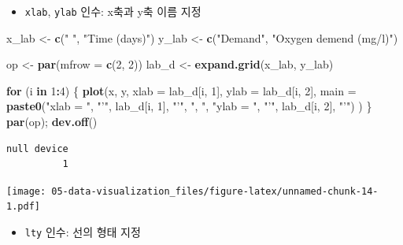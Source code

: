 \documentclass[
  11pt,
]{krantz}
\newenvironment{Shaded}{\begin{snugshade}}{\end{snugshade}}
\newcommand{\ControlFlowTok}[1]{\textcolor[rgb]{0.27,0.27,0.27}{\textbf{#1}}}
\newcommand{\DataTypeTok}[1]{\textcolor[rgb]{0.27,0.27,0.27}{#1}}
\newcommand{\DecValTok}[1]{\textcolor[rgb]{0.06,0.06,0.06}{#1}}
\newcommand{\KeywordTok}[1]{\textcolor[rgb]{0.27,0.27,0.27}{\textbf{#1}}}
\newcommand{\NormalTok}[1]{#1}
\newcommand{\OperatorTok}[1]{\textcolor[rgb]{0.43,0.43,0.43}{\textbf{#1}}}
\newcommand{\StringTok}[1]{\textcolor[rgb]{0.5,0.5,0.5}{#1}}
\providecommand{\tightlist}{%
  \setlength{\itemsep}{0pt}\setlength{\parskip}{0pt}}
\begin{document}
\normalsize

\begin{itemize}
\tightlist
\item
  \texttt{xlab}, \texttt{ylab} 인수: x축과 y축 이름 지정
\end{itemize}

\footnotesize

\begin{Shaded}
\begin{Highlighting}[]
\NormalTok{x_lab <-}\StringTok{ }\KeywordTok{c}\NormalTok{(}\StringTok{" "}\NormalTok{, }\StringTok{"Time (days)"}\NormalTok{)}
\NormalTok{y_lab <-}\StringTok{ }\KeywordTok{c}\NormalTok{(}\StringTok{"Demand"}\NormalTok{, }\StringTok{"Oxygen demend (mg/l)"}\NormalTok{)}

\NormalTok{op <-}\StringTok{ }\KeywordTok{par}\NormalTok{(}\DataTypeTok{mfrow =} \KeywordTok{c}\NormalTok{(}\DecValTok{2}\NormalTok{, }\DecValTok{2}\NormalTok{))}
\NormalTok{lab_d <-}\StringTok{ }\KeywordTok{expand.grid}\NormalTok{(x_lab, y_lab)}

\ControlFlowTok{for}\NormalTok{ (i }\ControlFlowTok{in} \DecValTok{1}\OperatorTok{:}\DecValTok{4}\NormalTok{) \{}
  \KeywordTok{plot}\NormalTok{(x, y, }
       \DataTypeTok{xlab =}\NormalTok{ lab_d[i, }\DecValTok{1}\NormalTok{], }
       \DataTypeTok{ylab =}\NormalTok{ lab_d[i, }\DecValTok{2}\NormalTok{], }
       \DataTypeTok{main =} \KeywordTok{paste0}\NormalTok{(}\StringTok{"xlab = "}\NormalTok{, }\StringTok{"'"}\NormalTok{, lab_d[i, }\DecValTok{1}\NormalTok{], }\StringTok{"'"}\NormalTok{, }\StringTok{", "}\NormalTok{, }
                     \StringTok{"ylab = "}\NormalTok{, }\StringTok{"'"}\NormalTok{, lab_d[i, }\DecValTok{2}\NormalTok{], }\StringTok{"'"}\NormalTok{)}
\NormalTok{  )}
\NormalTok{\}}
\KeywordTok{par}\NormalTok{(op); }\KeywordTok{dev.off}\NormalTok{()}
\end{Highlighting}
\end{Shaded}

\begin{verbatim}
null device 
          1 
\end{verbatim}

\texttt{[image: 05-data-visualization\_files/figure-latex/unnamed-chunk-14-1.pdf]}

\normalsize

\begin{itemize}
\tightlist
\item
  \texttt{lty} 인수: 선의 형태 지정
\end{itemize}
\end{document}
